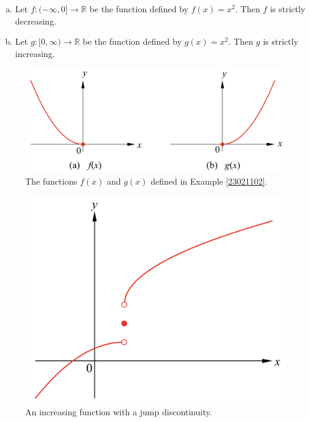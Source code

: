 \begin{example}
\begin{example}[label=23021102]{}
\begin{enumerate}[(a)]
\item Let $f:(-\infty, 0]\rightarrow\mathbb{R}$ be the function defined by $f(x)=x^2$. Then $f$ is strictly decreasing.

\item Let $g:[0, \infty)\rightarrow\mathbb{R}$ be the function defined by $g(x)=x^2$. Then $g$ is strictly increasing.\end{enumerate}
\end{example}


\begin{figure}[ht]
\centering
\includegraphics[scale=0.2]{Picture14.png}
\caption{  The functions $f(x)$ and $g(x)$ defined in Example \ref{23021102}.}\label{figure14}
\end{figure}





\begin{figure}[ht]
\centering
\includegraphics[scale=0.2]{Picture15.png}
\caption{  An increasing function with a jump discontinuity.}\label{figure15}
\end{figure}


\end{example}
